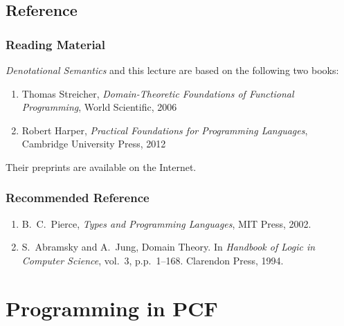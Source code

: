 \subsection*{Reference}
\begin{frame}
  \frametitle{Reading Material}
  \emph{Denotational Semantics} and this lecture are based on the following 
  two books:
  \begin{enumerate}
    \item Thomas Streicher, \emph{Domain-Theoretic Foundations of Functional
      Programming}, World Scientific, 2006
    \item Robert Harper, \emph{Practical Foundations for Programming
        Languages}, Cambridge University Press, 2012
  \end{enumerate}
  Their preprints are available on the Internet. \\
\end{frame}
\begin{frame}
  \frametitle{Recommended Reference}
  \begin{enumerate}
    \item B.\ C.\ Pierce, \emph{Types and Programming Languages}, MIT Press,
      2002.
    \item S.~Abramsky and A.~Jung, Domain Theory. In
    \emph{Handbook of Logic in Computer
        Science}, vol.~3, p.p.\ 1--168. Clarendon Press, 1994.
  \end{enumerate}
\end{frame}
\section{Programming in PCF}
